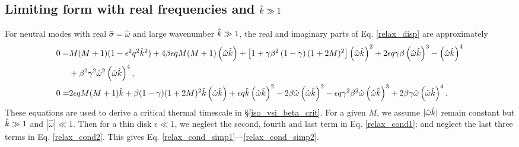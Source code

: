 \subsection{Limiting form with real frequencies and $\hat{k}\gg 1$}\label{disp_neut_limit}
For neutral modes with real $\hat{\sigma}=\hat{\omega}$ and large
wavenumber $\hat{k}\gg 1$, the real and imaginary parts of
Eq. \ref{relax_disp} are approximately 
\begin{align}
  0 =&M(M+1)(1-\epsilon^2 q^2 \hat{k}^2) + 4\beta\epsilon q M(M+1)\left(\hat{\omega}\hat{k}\right) 
 +\left[1 +
    \gamma\beta^2\left(1-\gamma\right)(1+2M)^2\right]\left(\hat{\omega}\hat{k}\right)^2
 + 2\epsilon q \gamma\beta \left(\hat{\omega}\hat{k}\right)^3 -  \left(\hat{\omega}\hat{k}\right)^4\notag \\
  &+ \beta^2\gamma^2\hat{\omega}^2
  \left(\hat{\omega}\hat{k}\right)^4,\label{relax_cond1} \\
   0=& 2\epsilon q M (M+1)\hat{k} +
   \beta(1-\gamma)(1+2M)^2\hat{k}\left(\hat{\omega}\hat{k}\right) 
   + \epsilon q \hat{k} \left(\hat{\omega}\hat{k}\right)^2 -
   2\beta\hat{\omega}\left(\hat{\omega}\hat{k}\right)^2
   - \epsilon q
   \gamma^2\beta^2\hat{\omega}\left(\hat{\omega}\hat{k}\right)^3 
   +
   2\beta\gamma\hat{\omega}\left(\hat{\omega}\hat{k}\right)^4 \label{relax_cond2}. 
\end{align}
These equations are used to derive a critical thermal timescale in
\S\ref{iso_vsi_beta_crit}. For a given $M$, we assume
$|\hat{\omega}\hat{k}|$ remain constant but $\hat{k}\gg 1$ and
$|\hat{\omega}|\ll 1$.  Then for a thin disk $\epsilon \ll 1$,
we neglect the second, fourth and last term in Eq. \ref{relax_cond1};
and neglect the last three terms in Eq. \ref{relax_cond2}. This gives
Eq. \ref{relax_cond_simp1}---\ref{relax_cond_simp2}.





